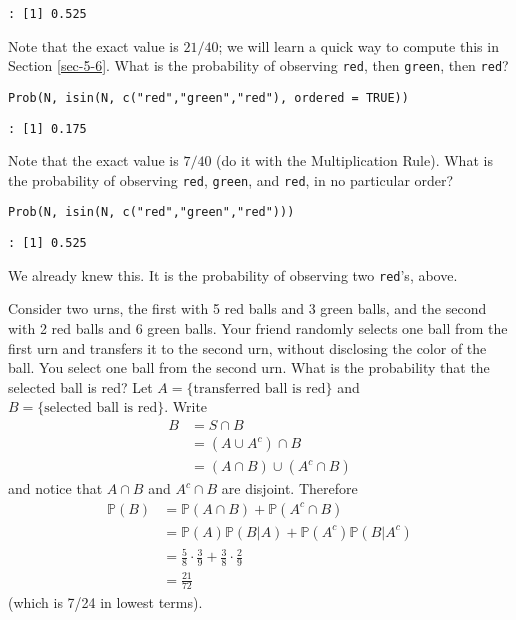 \begin{verbatim}
: [1] 0.525
\end{verbatim}

Note that the exact value is \(21/40\); we will learn a quick way to
compute this in Section \ref{sec-5-6}. What is the
probability of observing \texttt{red}, then \texttt{green}, then \texttt{red}?

\begin{verbatim}
Prob(N, isin(N, c("red","green","red"), ordered = TRUE))
\end{verbatim}

\begin{verbatim}
: [1] 0.175
\end{verbatim}

Note that the exact value is \(7/40\) (do it with the Multiplication
Rule). What is the probability of observing \texttt{red}, \texttt{green}, and \texttt{red},
in no particular order?

\begin{verbatim}
Prob(N, isin(N, c("red","green","red")))
\end{verbatim}

\begin{verbatim}
: [1] 0.525
\end{verbatim}

We already knew this. It is the probability of observing two \texttt{red}'s,
above.


Consider two urns, the first with 5 red balls and 3 green balls, and
the second with 2 red balls and 6 green balls. Your friend randomly
selects one ball from the first urn and transfers it to the second
urn, without disclosing the color of the ball. You select one ball
from the second urn. What is the probability that the selected ball is
red? Let \( A = \{ \mbox{transferred ball is red} \} \) and \( B = \{
\mbox{selected ball is red} \} \). Write
\begin{align*}
B & =S\cap B\\
 & =(A\cup A^{c})\cap B\\
 & =(A\cap B)\cup(A^{c}\cap B)
\end{align*}
and notice that \(A\cap B\) and \(A^{c}\cap B\) are disjoint. Therefore
\begin{align*}
\mathbb{P}(B) & =\mathbb{P}(A\cap B)+\mathbb{P}(A^{c}\cap B)\\
 & =\mathbb{P}(A)\mathbb{P}(B|A)+\mathbb{P}(A^{c})\mathbb{P}(B|A^{c})\\
 & =\frac{5}{8}\cdot\frac{3}{9}+\frac{3}{8}\cdot\frac{2}{9}\\
 & =\frac{21}{72}\ 
\end{align*}
(which is 7/24 in lowest terms).




